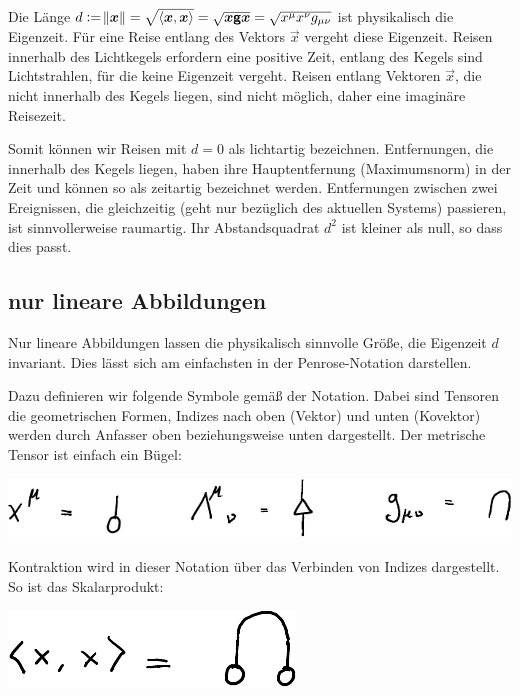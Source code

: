 Die Länge $d := \norm{\boldsymbol{x}} = \sqrt{\left\langle \boldsymbol{x}, \boldsymbol{x} \right\rangle} = \sqrt{\boldsymbol{x}
\boldsymbol{\mathsf{g}} \boldsymbol{x}} = \sqrt{x^\mu x^\nu g_{\mu \nu}}$ ist physikalisch die
Eigenzeit. Für eine Reise entlang des Vektors $\vec x$ vergeht diese Eigenzeit.
Reisen innerhalb des Lichtkegels erfordern eine positive Zeit, entlang des
Kegels sind Lichtstrahlen, für die keine Eigenzeit vergeht. Reisen entlang
Vektoren $\vec x$, die nicht innerhalb des Kegels liegen, sind nicht möglich,
daher eine imaginäre Reisezeit.

Somit können wir Reisen mit $d = 0$ als lichtartig bezeichnen. Entfernungen,
die innerhalb des Kegels liegen, haben ihre Hauptentfernung (Maximumsnorm) in
der Zeit und können so als zeitartig bezeichnet werden. Entfernungen zwischen
zwei Ereignissen, die gleichzeitig (geht nur bezüglich des aktuellen Systems)
passieren, ist sinnvollerweise raumartig. Ihr Abstandsquadrat $d^2$ ist kleiner
als null, so dass dies passt.

\subsection{nur lineare Abbildungen}

Nur lineare Abbildungen lassen die physikalisch sinnvolle Größe, die Eigenzeit
$d$ invariant. Dies lässt sich am einfachsten in der Penrose-Notation
darstellen. \cite{penrose-road_to_reality}

Dazu definieren wir folgende Symbole gemäß der Notation. Dabei sind Tensoren
die geometrischen Formen, Indizes nach oben (Vektor) und unten (Kovektor)
werden durch Anfasser oben beziehungsweise unten dargestellt. Der metrische
Tensor ist einfach ein Bügel:
\begin{center}
	\includegraphics{H1-Definitionen.pdf}
\end{center}

Kontraktion wird in dieser Notation über das Verbinden von Indizes dargestellt.
So ist das Skalarprodukt:
\begin{center}
	\includegraphics{H1-Skalarprodukt.pdf}
\end{center}

